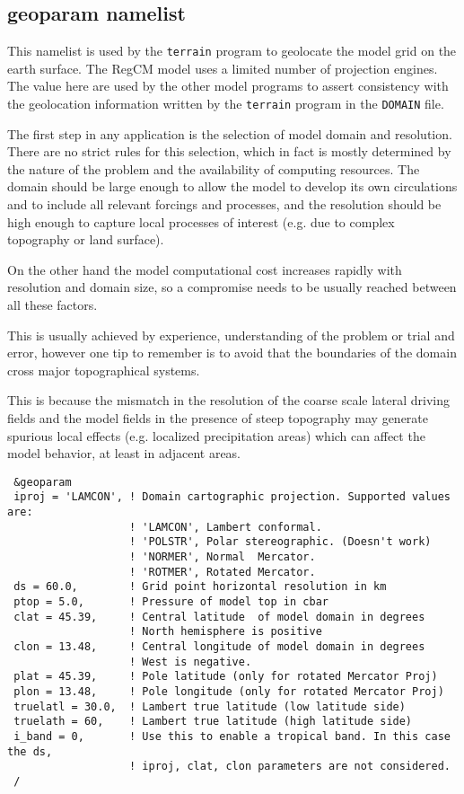 \subsection{geoparam namelist}
\label{geoparam}

This namelist is used by the \verb=terrain= program to geolocate the model grid
on the earth surface. The RegCM model uses a limited number of projection
engines. The value here are used by the other model programs to assert
consistency with the geolocation information written by the \verb=terrain=
program in the \verb=DOMAIN= file.

The first step in any application is the selection of model domain and
resolution. There are no strict rules for this selection, which in fact is
mostly determined by the nature of the problem and the availability of
computing resources. The domain should be large enough to allow the model to
develop its own circulations and to include all relevant forcings and
processes, and the resolution should be high enough to capture local processes
of interest (e.g. due to complex topography or land surface).

On the other hand the model computational cost increases rapidly with
resolution and domain size, so a compromise needs to be usually reached
between all these factors.

This is usually achieved by experience, understanding of the problem or
trial and error, however one tip to remember is to avoid that the boundaries
of the domain cross major topographical systems.

This is because the mismatch in the resolution of the coarse scale lateral
driving fields and the model fields in the presence of steep topography may
generate spurious local effects (e.g. localized precipitation areas) which can
affect the model behavior, at least in adjacent areas. 

{\footnotesize
\begin{Verbatim}
 &geoparam
 iproj = 'LAMCON', ! Domain cartographic projection. Supported values are:
                   ! 'LAMCON', Lambert conformal.
                   ! 'POLSTR', Polar stereographic. (Doesn't work)
                   ! 'NORMER', Normal  Mercator.
                   ! 'ROTMER', Rotated Mercator.
 ds = 60.0,        ! Grid point horizontal resolution in km
 ptop = 5.0,       ! Pressure of model top in cbar
 clat = 45.39,     ! Central latitude  of model domain in degrees
                   ! North hemisphere is positive
 clon = 13.48,     ! Central longitude of model domain in degrees
                   ! West is negative.
 plat = 45.39,     ! Pole latitude (only for rotated Mercator Proj)
 plon = 13.48,     ! Pole longitude (only for rotated Mercator Proj)
 truelatl = 30.0,  ! Lambert true latitude (low latitude side)
 truelath = 60,    ! Lambert true latitude (high latitude side)
 i_band = 0,       ! Use this to enable a tropical band. In this case the ds,
                   ! iproj, clat, clon parameters are not considered.
 /
\end{Verbatim}
}

